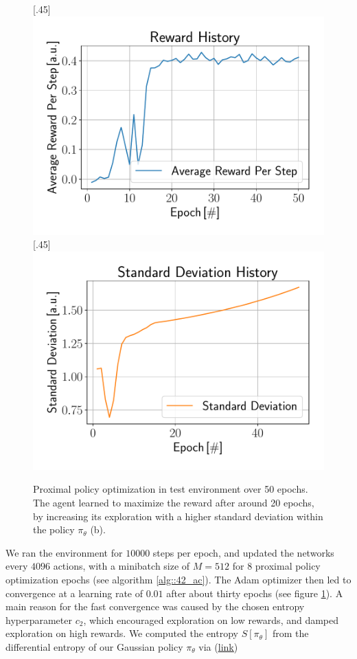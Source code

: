 \begin{figure}[h!]
	\centering
	[.45\linewidth]{\includegraphics[scale=.35]{chapters/11_autonomous_walking_experiments/img/ppo_reward_history.pdf}}	
	[.45\linewidth]{\includegraphics[scale=.35]{chapters/11_autonomous_walking_experiments/img/ppo_std_history.pdf}}
	\caption{Proximal policy optimization in test environment over 50 epochs. The agent learned to maximize the reward after around 20 epochs, by increasing its exploration with a higher standard deviation within the policy $\pi_\theta$ (b).}	
	\label{fig::431_ppo_hist}
\end{figure}
We ran the environment for $10000$ steps per epoch, and updated the networks every $4096$ actions, with a minibatch size of $M=512$ for $8$ proximal policy optimization epochs (see algorithm \ref{alg::42_ac}). The Adam optimizer then led to convergence at a learning rate of $0.01$ after about thirty epochs (see figure \ref{fig::431_ppo_hist}). A main reason for the fast convergence was caused by the chosen entropy hyperparameter $c_2$, which encouraged exploration on low rewards, and damped exploration on high rewards. We computed the entropy $S[\pi_\theta]$ from the differential entropy of our Gaussian policy $\pi_\theta$ via (\href{https://github.com/mhubii/ppo_libtorch/blob/481c1e326dcd6220b2c1c955a0303a410c2cb0dd/Models.h#L82}{\underline{link}})
